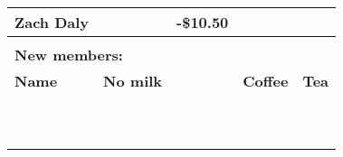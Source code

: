 \begin{longtable}{|l|c|r|p{9cm}|p{5cm}|}
Zach Daly &  & \textbf{-\$10.50} & & \\\hline
\multicolumn{4}{l}{}\\[15ex]
\multicolumn{4}{l}{\textbf{New members:}}\\[1ex]\hline
\textbf{Name}&\textbf{No milk}&&\textbf{Coffee} & \textbf{Tea} \\\hline
&&&\\\hline
&&&\\\hline
&&&\\\hline
&&&\\\hline
&&&\\\hline
&&&\\\hline
&&&\\\hline
&&&\\\hline
&&&\\\hline
&&&\\\hline
\end{longtable}
